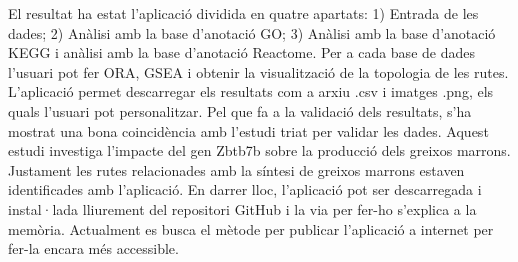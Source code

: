 El resultat ha estat l'aplicació dividida en quatre apartats: 1) Entrada de les dades; 2) Anàlisi amb la base d'anotació GO; 3) Anàlisi amb la base d'anotació \gls{KEGG} i anàlisi amb la base d'anotació Reactome. Per a cada base de dades l'usuari pot fer \gls{ORA}, \gls{GSEA} i obtenir la visualització de la topologia de les rutes. L'aplicació permet descarregar els resultats com a arxiu .csv i imatges .png, els quals l'usuari pot personalitzar. 
Pel que fa a la validació dels resultats, s’ha mostrat una bona coincidència amb l'estudi triat per validar les dades. Aquest estudi investiga l'impacte del gen Zbtb7b sobre la producció dels greixos marrons. Justament les rutes relacionades amb la síntesi de greixos marrons estaven identificades amb l'aplicació. En darrer lloc, l'aplicació pot ser descarregada i instal·lada lliurement del repositori GitHub i la via per fer-ho s'explica a la memòria. Actualment es busca el mètode per publicar l'aplicació a internet per fer-la encara més accessible.


